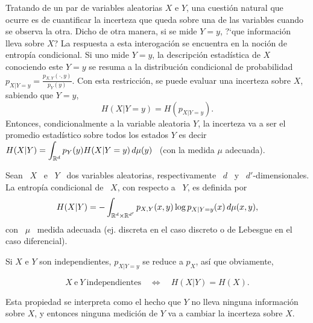 \label{Sec:SZ:Mutua}

Tratando de un par de variables aleatorias $X$ e $Y$, una cuesti\'on natural que
ocurre  es de  cuantificar la  incerteza que  queda sobre  una de  las variables
cuando se  observa la otra.   Dicho de otra  manera, si se  mide $Y =  y$, ?`que
informaci\'on lleva sobre  $X$? La respuesta a esta  interogaci\'on se encuentra
en la noci\'on de entrop\'ia condicional.  Si uno mide $Y = y$, la descripci\'on
estad\'istica  de $X$  conociendo este  $Y =  y$ se  resuma a  la distribuci\'on
condicional de probabilidad  $p_{X|Y=y} = \frac{p_{X,Y}(\cdot,y)}{p_Y(y)}$.  Con
esta  restricci\'on, se  puede evaluar  una  incerteza sobre  $X$, sabiendo  que
$Y=y$,
%
\[
H(X|Y=y) = H\left( p_{X|Y=y} \right).
\]
%
Entonces, condicionalmente a la variable aleatoria $Y$, la incerteza va a ser el
promedio  estad\'istico sobre  todos  los estados  $Y$  es decir  $\displaystyle
H(X|Y)  = \int_{\mathbb{R}^d}  p_Y(y) H(X|Y=y)  \, d\mu(y)$  \ (con  la  medida $\mu$
adecuada).
%
\begin{definicion}
\label{Def:SZ:entropiacondicional}
%
  Sean \ $X$ \ e \ $Y$ \ dos variables aleatorias, respectivamente \ $d$ \ y \
  $d'$-dimensionales. La entrop\'ia condicional de  \ $X$, con respecto a \ $Y$,
  es definida por
  \[
  H(X|Y)   =   -  \int_{\mathbb{R}^d   \times   \mathbb{R}^{d'}}  p_{X,Y}(x,y)   \log
  p_{X|Y=y}(x) \, d\mu(x,y),
  \]
  con \ $\mu$ \ medida adecuada (ej.  discreta en el caso discreto o de Lebesgue
  en el caso diferencial).
\end{definicion}

Si  $X$ e  $Y$ son  independientes,  $p_{X|Y=y}$ se  reduce a  $p_X$, as\'i  que
obviamente,
%
\begin{propiedades}
\item\label{Prop:SZ:independenciacondicional}
  \[
  X \: \mbox{e} \: Y \: \mbox{independientes} \quad \Leftrightarrow \quad H(X|Y)
  = H(X).
  \]
\end{propiedades}
%
Esta  propiedad  se   interpreta  como  el  hecho  que   $Y$  no  lleva  ninguna
informaci\'on sobre  $X$, y entonces ninguna  medici\'on de $Y$ va  a cambiar la
incerteza sobre $X$.

